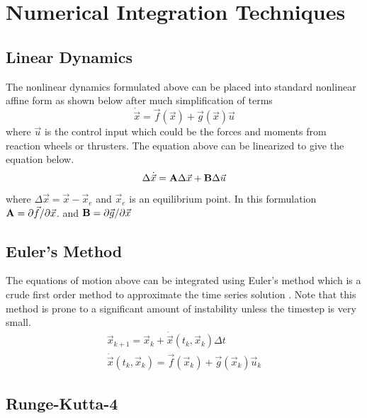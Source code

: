 \section{Numerical Integration Techniques}

\subsection{Linear Dynamics}

The nonlinear dynamics formulated above can be placed into standard
nonlinear affine form as shown below after much simplification of
terms
\begin{equation}
  \dot{\vec{x}} = \vec{f}(\vec{x}) + \vec{g}(\vec{x})\vec{u}
\end{equation}
where $\vec{u}$ is the control input which could be the forces and
moments from reaction wheels or thrusters. The equation above can be
linearized to give the equation below. 
\begin{equation}
  \Delta \dot{\vec{x}} = {\bf A}\Delta {\vec{x}} + {\bf B}\Delta \vec{u}
\end{equation}
where $\Delta \vec{x} = \vec{x} - \vec{x}_e$ and $\vec{x}_e$ is an
equilibrium point. In this formulation ${\bf A} = \partial \vec{f}/\partial \vec{x}$. and 
${\bf B} = \partial \vec{g}/\partial \vec{x}$

\subsection{Euler's Method}

The equations of motion above can be integrated using Euler's method
which is a crude first order method to approximate the time series
solution \cite{Chapra_MEANALYSIS}. Note that this method is prone to a 
significant amount of instability unless the timestep is very small. 
\begin{equation}
  \begin{matrix}
    \vec{x}_{k+1} = \vec{x}_k + \dot{\vec{x}}(t_k,\vec{x}_k) \Delta t \\
    \dot{\vec{x}}(t_k,\vec{x}_k) = \vec{f}(\vec{x}_k) + \vec{g}(\vec{x}_k)\vec{u}_k
  \end{matrix}
\end{equation}

\subsection{Runge-Kutta-4}

